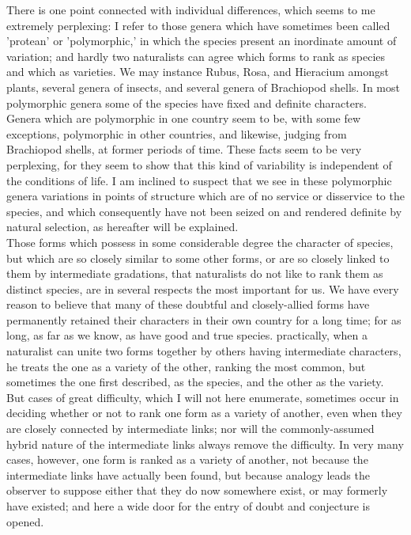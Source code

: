 \indent There is one point connected with individual differences, which seems to me extremely perplexing: I refer to those genera which have sometimes been called 'protean' or 'polymorphic,' in which the species present an inordinate amount of variation; and hardly two naturalists can agree which forms to rank as species and which as varieties. We may instance Rubus, Rosa, and Hieracium amongst plants, several genera of insects, and several genera of Brachiopod shells. In most polymorphic genera some of the species have fixed and definite characters. Genera which are polymorphic in one country seem to be, with some few exceptions, polymorphic in other countries, and likewise, judging from Brachiopod shells, at former periods of time. These facts seem to be very perplexing, for they seem to show that this kind of variability is independent of the conditions of life. I am inclined to suspect that we see in these polymorphic genera variations in points of structure which are of no service or disservice to the species, and which consequently have not been seized on and rendered definite by natural selection, as hereafter will be explained. \\
\indent Those forms which possess in some considerable degree the character of species, but which are so closely similar to some other forms, or are so closely linked to them by intermediate gradations, that naturalists do not like to rank them as distinct species, are in several respects the most important for us. We have every reason to believe that many of these doubtful and closely-allied forms have permanently retained their characters in their own country for a long time; for as long, as far as we know, as have good and true species.  practically, when a naturalist can unite two forms together by others having intermediate characters, he treats the one as a variety of the other, ranking the most common, but sometimes the one first described, as the species, and the other as the variety. But cases of great difficulty, which I will not here enumerate, sometimes occur in deciding whether or not to rank one form as a variety of another, even when they are closely connected by intermediate links; nor will the commonly-assumed hybrid nature of the intermediate links always remove the difficulty. In very many cases, however, one form is ranked as a variety of another, not because the intermediate links have actually been found, but because analogy leads the observer to suppose either that they do now somewhere exist, or may formerly have existed; and here a wide door for the entry of doubt and conjecture is opened. \\
